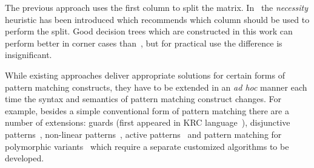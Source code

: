 The previous approach uses the first column to split the matrix. In~\cite{maranget2008} the \emph{necessity} heuristic has been introduced which recommends which column should be
used to perform the split. Good decision trees which are constructed in this work can perform better in corner cases than~\cite{maranget2001}, but for practical use the
difference is insignificant.

While existing approaches deliver appropriate solutions for certain forms of pattern matching constructs, they have to be extended in an \emph{ad hoc} manner each time
the syntax and semantics of pattern matching construct changes. For example, besides a simple conventional form of pattern matching there are a number of extensions:
guards (first appeared in KRC language~\cite{turner2013}), disjunctive patterns~\cite{ocaml}, non-linear patterns~\cite{mcbride1969symbol}, active patterns~\cite{activepatterns} and pattern matching for polymorphic variants~\cite{Garrigue98} 
which require a separate customized algorithms to be developed.

